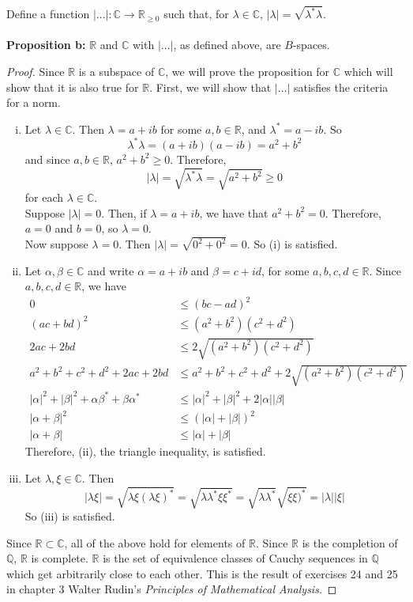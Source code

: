\documentclass[]{book}
\begin{document}
Define a function $|\dots|:\mathbb{C}\to \mathbb{R}_{\geqslant 0}$ such that, for $\lambda\in \mathbb{C}$, $|\lambda|=\sqrt{\lambda^*\lambda}$. \\ \\
{\bf Proposition b:} $\mathbb{R}$ and $\mathbb{C}$ with $|\dots|$, as defined above, are $B$-spaces.
\begin{proof}
Since $\mathbb{R}$ is a subspace of $\mathbb{C}$, we will prove the proposition for $\mathbb{C}$ which will show that it is also true for $\mathbb{R}$. First, we will show that $|\dots|$ satisfies the criteria for a norm.
\begin{enumerate}[(i)]
\item Let $\lambda\in \mathbb{C}$. Then $\lambda=a+ib$ for some $a,b\in \mathbb{R}$, and $\lambda^*=a-ib$. So 
$$\lambda^*\lambda=(a+ib)(a-ib)=a^2+b^2$$
and since $a,b\in \mathbb{R}$, $a^2+b^2 \geqslant 0$. Therefore,
$$|\lambda|=\sqrt{\lambda^*\lambda}=\sqrt{a^2+b^2} \geqslant 0$$
for each $\lambda\in\mathbb{C}$. \\
Suppose $|\lambda|=0$. Then, if $\lambda=a+ib$, we have that $a^2+b^2=0$. Therefore, $a=0$ and $b=0$, so $\lambda=0$. \\
Now suppose $\lambda=0$. Then $|\lambda|=\sqrt{0^2+0^2}=0$. So (i) is satisfied.
\item Let $\alpha,\beta\in \mathbb{C}$ and write $\alpha = a+ib$ and $\beta=c+id$, for some $a,b,c,d\in\mathbb{R}$. Since $a,b,c,d\in\mathbb{R}$, we have
\begin{align*}
0 &\leqslant (b c - a d)^2 \\
(ac + bd)^2 &\leqslant (a^2 + b^2)(c^2 + d^2) \\
2ac + 2bd &\leqslant 2\sqrt{(a^2 + b^2)(c^2 + d^2)} \\
a^2+b^2+c^2+d^2+2ac + 2bd &\leqslant a^2+b^2+c^2+d^2+2\sqrt{(a^2 + b^2)(c^2 + d^2)} \\
|\alpha|^2+|\beta|^2+\alpha\beta^*+\beta\alpha^* &\leqslant |\alpha|^2+|\beta|^2 + 2|\alpha||\beta| \\
|\alpha+\beta|^2 &\leqslant (|\alpha|+|\beta|)^2 \\
|\alpha+\beta| &\leqslant |\alpha|+|\beta| 
\end{align*}
Therefore, (ii), the triangle inequality, is satisfied. 
\item Let $\lambda,\xi\in \mathbb{C}$. Then 
$$|\lambda\xi|=\sqrt{\lambda\xi(\lambda\xi)^*}=\sqrt{\lambda\lambda^*\xi\xi^*}=\sqrt{\lambda\lambda^*}\sqrt{\xi\xi)^*}=|\lambda||\xi|$$
So (iii) is satisfied.
\end{enumerate}
Since $\mathbb{R}\subset\mathbb{C}$, all of the above hold for elements of $\mathbb{R}$.
Since $\mathbb{R}$ is the completion of $\mathbb{Q}$, $\mathbb{R}$ is complete. $\mathbb{R}$ is the set of equivalence classes of Cauchy sequences in $\mathbb{Q}$ which get arbitrarily close to each other. This is the result of exercises 24 and 25 in chapter 3 Walter Rudin's {\it Principles of Mathematical Analysis}.
\end{proof}
\end{document}
